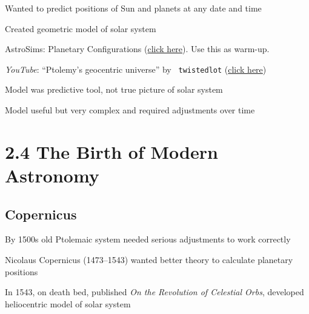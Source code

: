 \documentclass{article}
\begin{document}
Wanted to predict positions of Sun and planets at any date and time

Created geometric model of solar system 

 AstroSims: Planetary Configurations (\href{https://foothillastrosims.github.io/planetary-config-react/}{click here}). Use this as warm-up.

 \textit{YouTube}: ``Ptolemy's geocentric universe'' by \texttt{
twistedlot} (\href{https://youtu.be/utH-GHH1FT8}{click here})

Model was predictive tool, not true picture of solar system

Model useful but very complex and required adjustments over time

\hgraydashline

\clearpage
\section*{2.4 The Birth of Modern Astronomy}





\subsection*{Copernicus} 

By 1500s old Ptolemaic system needed serious adjustments to work correctly

Nicolaus Copernicus (1473--1543) wanted better theory to calculate planetary positions

In 1543, on death bed, published \textit{On the Revolution of Celestial Orbs}, developed heliocentric model of solar system
\end{document}
